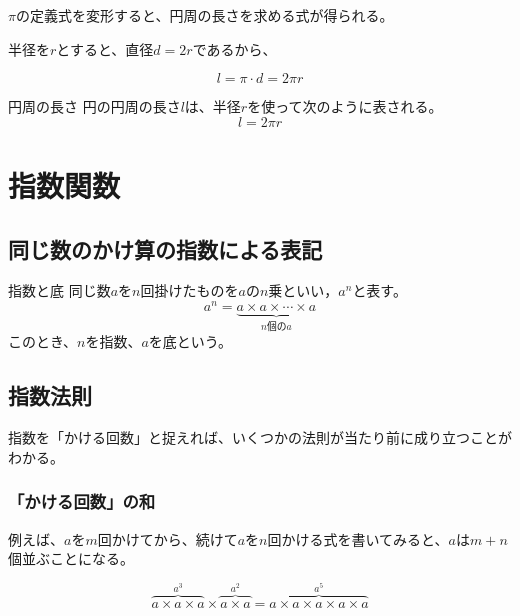 \documentclass[../math-imaging]{subfiles}
\begin{document}
$\pi$の定義式を変形すると、円周の長さを求める式が得られる。

半径を$r$とすると、直径$d = 2r$であるから、

\begin{equation}
  l = \pi \cdot d = 2\pi r
\end{equation}

\begin{theorem}{円周の長さ}
  円の円周の長さ$l$は、半径$r$を使って次のように表される。
  \LARGE
  \begin{equation}
    l = 2\pi r
  \end{equation}
\end{theorem}

\section{指数関数}

\subsection{同じ数のかけ算の指数による表記}

\begin{definition}{指数と底}
  \newline
  同じ数$a$を$n$回掛けたものを$a$の$n$乗といい，$a^n$と表す。
  \LARGE
  \begin{equation}
    a^n = \underbrace{a \times a \times \cdots \times a}_{n\text{個の}a}
  \end{equation}
  \normalsize
  このとき、$n$を指数、$a$を底という。
\end{definition}

\subsection{指数法則}

指数を「かける回数」と捉えれば、いくつかの法則が当たり前に成り立つことがわかる。

\subsubsection{「かける回数」の和}

例えば、$a$を$m$回かけてから、続けて$a$を$n$回かける式を書いてみると、$a$は$m+n$個並ぶことになる。

\begin{equation}
  \overbrace{a\times a\times a}^{a^3} \times \overbrace{a\times a}^{a^2} = \overbrace{a\times a\times a\times a\times a}^{a^5}
\end{equation}
\end{document}
